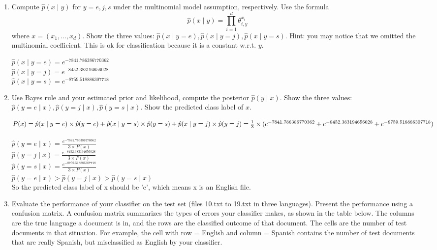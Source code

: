 \documentclass[a4paper]{article}
\theoremstyle{definition}
\newenvironment{soln}{
    \leavevmode\color{blue}\ignorespaces
}{}
\begin{document}
\begin{enumerate}
\item
Compute $\hat p(x \mid y)$ for $y=e, j, s$ under the multinomial model assumption, respectively.
Use the formula
$$\hat p(x \mid y) = \prod_{i=1}^d \theta_{i, y}^{x_i}$$
where $x=(x_1, \ldots, x_d)$.
Show the three values: $\hat p(x \mid y=e), \hat p(x \mid y=j), \hat p(x \mid y=s)$.
Hint: you may notice that we omitted the multinomial coefficient.  This is ok for classification because it is a constant w.r.t. $y$.

\begin{soln}
$\hat p(x \mid y=e) =  e^ {-7841.786386770362}$\\
$\hat p(x \mid y=j) =  e^{-8452.383194656028}$\\
$\hat p(x \mid y=s) = e^{-8759.518886307718}$\\
\end{soln}

\item
Use Bayes rule and your estimated prior and likelihood, compute the posterior $\hat p(y \mid x)$.
Show the three values: $\hat p(y=e \mid x), \hat p(y=j \mid x), \hat p(y=s \mid x)$.
Show the predicted class label of $x$.

\begin{soln}
$P(x) = \hat p(x \mid y=e) \times \hat p(y=e)+\hat p(x \mid y=s) \times \hat p(y=s)+\hat p(x \mid y=j) \times \hat p(y=j) \\=   \frac{1}{3} \times (e^ {-7841.786386770362} +  e^{-8452.383194656028} +  e^{-8759.518886307718})$\\\\
$\hat p(y=e \mid x) = \frac{e^ {-7841.786386770362}}{3 \times P(x) }$\\
$\hat p(y=j \mid x) = \frac{e^{-8452.383194656028}}{3 \times P(x)}$\\
$\hat p(y=s \mid x) = \frac{e^{-8759.518886307718}}{3 \times P(x)}$\\

$\hat p(y=e \mid x) > \hat p(y=j \mid x) > \hat p(y=s \mid x)$\\
So the predicted class label of x should be 'e', which means x is an English file.
\end{soln}

\item
Evaluate the performance of your classifier on the test set (files 10.txt to 19.txt in three languages).
Present the performance using a confusion matrix. A confusion matrix summarizes the types of errors your classifier makes, as shown in the table below.   The columns are the true language a document is in, and the rows are the classified outcome of that document.  The cells are the number of test documents in that situation.  For example, the cell with row = English and column = Spanish contains the number of test documents that are really Spanish, but misclassified as English by your classifier.


\end{enumerate}
\end{document}
